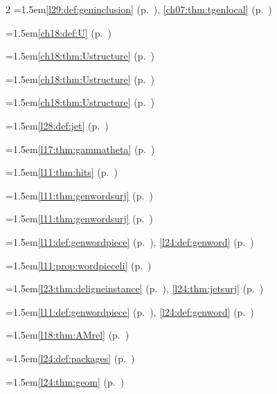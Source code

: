 \begin{multicols}{2}
\hangindent=1.5em\quad \ref{l29:def:geninclusion} (p.~\pageref{l29:def:geninclusion}), \ref{ch07:thm:tgenlocal} (p.~\pageref{ch07:thm:tgenlocal})\par
\hangindent=1.5em\quad \ref{ch18:def:U} (p.~\pageref{ch18:def:U})\par
\hangindent=1.5em\quad \ref{ch18:thm:Ustructure} (p.~\pageref{ch18:thm:Ustructure})\par
\hangindent=1.5em\quad \ref{ch18:thm:Ustructure} (p.~\pageref{ch18:thm:Ustructure})\par
\hangindent=1.5em\quad \ref{ch18:thm:Ustructure} (p.~\pageref{ch18:thm:Ustructure})\par
\hangindent=1.5em\quad \ref{l28:def:jet} (p.~\pageref{l28:def:jet})\par
\hangindent=1.5em\quad \ref{l17:thm:gammatheta} (p.~\pageref{l17:thm:gammatheta})\par
\hangindent=1.5em\quad \ref{l11:thm:hits} (p.~\pageref{l11:thm:hits})\par
\hangindent=1.5em\quad \ref{l11:thm:genwordsurj} (p.~\pageref{l11:thm:genwordsurj})\par
\hangindent=1.5em\quad \ref{l11:thm:genwordsurj} (p.~\pageref{l11:thm:genwordsurj})\par
\hangindent=1.5em\quad \ref{l11:def:genwordpiece} (p.~\pageref{l11:def:genwordpiece}), \ref{l24:def:genword} (p.~\pageref{l24:def:genword})\par
\hangindent=1.5em\quad \ref{l11:prop:wordpieceli} (p.~\pageref{l11:prop:wordpieceli})\par
\hangindent=1.5em\quad \ref{l23:thm:deligneinstance} (p.~\pageref{l23:thm:deligneinstance}), \ref{l24:thm:jetsurj} (p.~\pageref{l24:thm:jetsurj})\par
\hangindent=1.5em\quad \ref{l11:def:genwordpiece} (p.~\pageref{l11:def:genwordpiece}), \ref{l24:def:genword} (p.~\pageref{l24:def:genword})\par
\hangindent=1.5em\quad \ref{l18:thm:AMrel} (p.~\pageref{l18:thm:AMrel})\par
\hangindent=1.5em\quad \ref{l24:def:packages} (p.~\pageref{l24:def:packages})\par
\hangindent=1.5em\quad \ref{l24:thm:geom} (p.~\pageref{l24:thm:geom})\par

\end{multicols}

